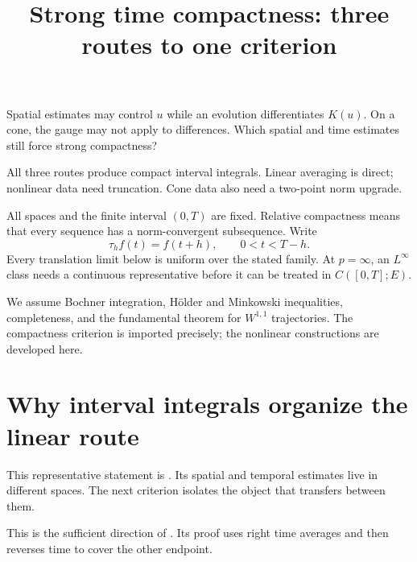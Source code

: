 \documentclass[12pt,reqno]{amsart}
\title{Strong time compactness: three routes to one criterion}
\date{}
\begin{document}
\maketitle

Spatial estimates may control $u$ while an evolution differentiates $K(u)$. On a cone, the gauge may not apply to differences. Which spatial and time estimates still force strong compactness?

All three routes produce compact interval integrals. Linear averaging is direct; nonlinear data need truncation. Cone data also need a two-point norm upgrade.

All spaces and the finite interval $(0,T)$ are fixed. Relative compactness means that every sequence has a norm-convergent subsequence. Write
\[
\tau_h f(t)=f(t+h),\qquad 0<t<T-h.
\]
Every translation limit below is uniform over the stated family. At $p=\infty$, an $L^\infty$ class needs a continuous representative before it can be treated in $C([0,T];E)$.

We assume Bochner integration, H\"older and Minkowski inequalities, completeness, and the fundamental theorem for $W^{1,1}$ trajectories. The compactness criterion is imported precisely; the nonlinear constructions are developed here.

\section{Why interval integrals organize the linear route}

\begin{theorem}[Simon]\label{thm:simon}

\end{theorem}

This representative statement is \cite[Theorem 5, pp.~84--85]{S-simon}. Its spatial and temporal estimates live in different spaces. The next criterion isolates the object that transfers between them.

\begin{lemma}[Simon]\label{lem:criterion}

\end{lemma}

This is the sufficient direction of \cite[Theorem 1, pp.~71--73]{S-simon}. Its proof uses right time averages and then reverses time to cover the other endpoint.
\end{document}
